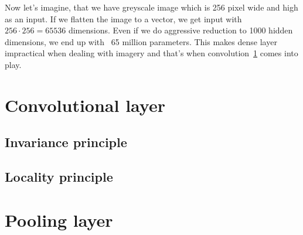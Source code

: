 Now let's imagine, that we have greyscale image which is 256 pixel wide and high as an input.
If we flatten the image to a vector, we get input with $256\cdot256 = 65536$ dimensions.
Even if we do aggressive reduction to 1000 hidden dimensions, we end up with ~65 million parameters.
This makes dense layer impractical when dealing with imagery and that's when convolution~\ref{sec:convolutional} comes
into play.

\section{Convolutional layer}\label{sec:convolutional}

\subsection{Invariance principle}\label{subsec:invariance}
\subsection{Locality principle}\label{subsec:locality}

\section{Pooling layer}\label{sec:pooling}

